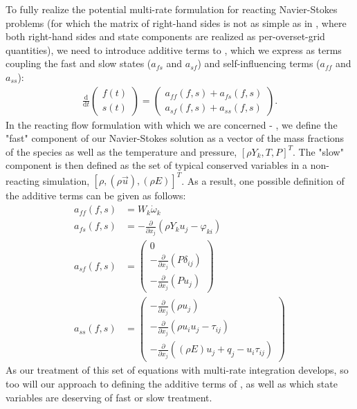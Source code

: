 To fully realize the potential multi-rate formulation for reacting
Navier-Stokes problems (for which the matrix of right-hand sides is
not as simple as in \cite{mikida2019multi}, where both right-hand sides
and state components are realized as per-overset-grid quantities),
we need to introduce additive terms to , which we express
as terms coupling the fast and slow states ($a_{fs}$ and $a_{sf}$) and
self-influencing terms ($a_{ff}$ and $a_{ss}$):
\begin{align}
\frac{\textrm{d}}{\textrm{d}t}\left( \begin{array}{c} f(t) \\ s(t) \end{array} \right) = \left( \begin{array}{c} a_{ff}(f,s) + a_{fs}(f,s) \\ a_{sf}(f,s) + a_{ss}(f,s) \end{array} \right). \label{eq:mr_reacting}
\end{align}
In the reacting flow formulation with which we are concerned  - , we define
the "fast" component of our Navier-Stokes solution as a vector of the
mass fractions of the species as well as the temperature and pressure, $[\rho Y_{k}, T, P]^T$.
The "slow" component is then defined as the set of typical conserved variables in a
non-reacting simulation, $[\rho, (\rho \vec{u}), (\rho E)]^T$. As
a result, one possible definition of the additive terms  can be given as follows:
\begin{align}
a_{ff}(f,s) &= W_{k}\dot{\omega}_{k} \\
a_{fs}(f,s) &= -\frac{\partial}{\partial x_{j}}(\rho Y_{k} u_{j} - \varphi_{ki}) \\
a_{sf}(f,s) &= \left(\begin{array}{c} 0 \\
                                      -\frac{\partial}{\partial x_{j}}(P\delta_{ij}) \\
                                      -\frac{\partial}{\partial x_{j}}(Pu_{j}) \end{array} \right) \\
a_{ss}(f,s) &= \left(\begin{array}{c} -\frac{\partial}{\partial x_{j}}(\rho u_{j}) \\
                                      -\frac{\partial}{\partial x_{j}}(\rho u_{i} u_{j} - \tau_{ij}) \\
                                      -\frac{\partial}{\partial x_{j}}((\rho E)u_{j} + q_{j} - u_{i}\tau_{ij}) \end{array} \right)
\end{align}
As our treatment of this set of equations with multi-rate integration develops,
so too will our approach to defining the additive terms of ,
as well as which state variables are deserving of fast or slow treatment.

